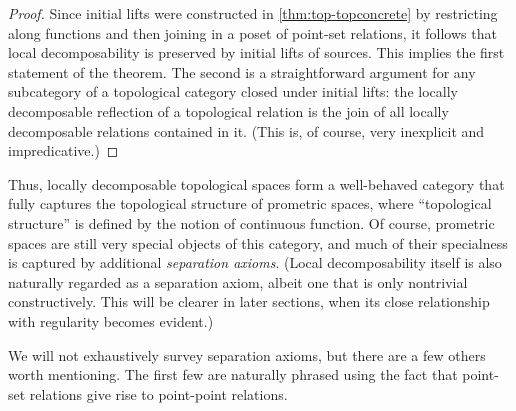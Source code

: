 \documentclass{article}
\begin{document}
\begin{proof}
  Since initial lifts were constructed in \cref{thm:top-topconcrete} by restricting along functions and then joining in a poset of point-set relations, it follows that local decomposability is preserved by initial lifts of sources.
  This implies the first statement of the theorem.
  The second is a straightforward argument for any subcategory of a topological category closed under initial lifts: the locally decomposable reflection of a topological relation is the join of all locally decomposable relations contained in it.
  (This is, of course, very inexplicit and impredicative.)
\end{proof}

Thus, locally decomposable topological spaces form a well-behaved category that fully captures the topological structure of prometric spaces, where ``topological structure'' is defined by the notion of continuous function.
Of course, prometric spaces are still very special objects of this category, and much of their specialness is captured by additional \emph{separation axioms}.
(Local decomposability itself is also naturally regarded as a separation axiom, albeit one that is only nontrivial constructively.
This will be clearer in later sections, when its close relationship with regularity becomes evident.)

We will not exhaustively survey separation axioms, but there are a few others worth mentioning.
The first few are naturally phrased using the fact that point-set relations give rise to point-point relations.
\end{document}
